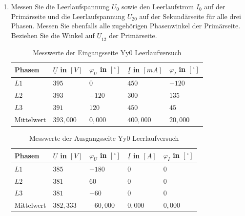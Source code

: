\begin{enumerate}[label=\alph*)]
  \item Messen Sie die Leerlaufspannung $U_0$ sowie den Leerlaufstrom $I_0$ auf der
        Primärseite und die Leerlaufspannung $U_{20}$ auf der Sekundärseite für alle
        drei Phasen. Messen Sie ebenfalls alle zugehörigen Phasenwinkel der
        Primärseite. Beziehen Sie die Winkel auf $\underline U_{12}$ der Primärseite.

        \begin{table}[h!]
          \caption{Messwerte der Eingangsseite Yy0 Leerlaufversuch}
          \centering
          \begin{tabular}{lllll}
            \\ \hline
            Phasen     & $\underline{U}$ in $[V]$ & $\varphi_{U}$ in $[^\circ]$ & $\underline{I}$ in $[mA]$ & $\varphi_{I}$ in $[^\circ]$ \\ \hline
            $L1$       & $395$                    & $0$                         & $450$                     & $-120$                      \\
            $L2$       & $393$                    & $-120$                      & $300$                     & $135$                       \\
            $L3$       & $391$                    & $120$                       & $450$                     & $45$                        \\ \hline
            Mittelwert & $393,000$                & $0,000$                     & $400,000$                 & $20,000$                    \\ \hline\hline
          \end{tabular}
        \end{table}
        \begin{table}[h!]
          \centering
          \caption{Messwerte der Ausgangsseite Yy0 Leerlaufversuch}
          \begin{tabular}{lllll}
            \\ \hline
            Phasen     & $\underline{U}$ in $[V]$ & $\varphi_{U}$ in $[^\circ]$ & $\underline{I}$ in $[A]$ & $\varphi_{I}$ in $[^\circ]$ \\ \hline
            $L1$       & $385$                    & $-180$                      & $0$                      & $0$                         \\
            $L2$       & $381$                    & $60$                        & $0$                      & $0$                         \\
            $L3$       & $381$                    & $-60$                       & $0$                      & $0$                         \\ \hline
            Mittelwert & $382,333$                & $-60,000$                   & $0,000$                  & $0,000$                     \\ \hline\hline
          \end{tabular}
        \end{table}
\end{enumerate}
